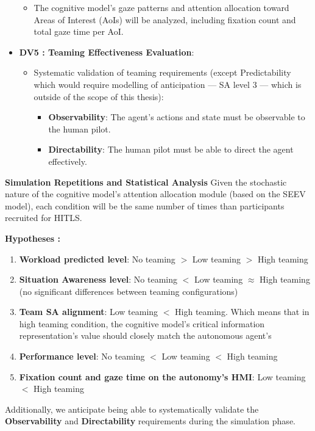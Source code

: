 \documentclass[12pt,a4paper]{article} %
\begin{document}
\begin{itemize}
	\begin{itemize}
	\item The cognitive model's gaze patterns and attention allocation toward Areas of Interest (AoIs) will be analyzed, including fixation count and total gaze time per AoI.
	\end{itemize}
	\item \textbf{DV5 : Teaming Effectiveness Evaluation}:
	\begin{itemize}
	\item Systematic validation of teaming requirements (except Predictability which would require modelling of anticipation --- SA level 3 --- which is outside of the scope of this thesis):
	\begin{itemize}
	\item \textbf{Observability}: The agent's actions and state must be observable to the human pilot.
	\item \textbf{Directability}: The human pilot must be able to direct the agent effectively.
	\end{itemize}
	\end{itemize}
	\end{itemize}
	
	\textbf{Simulation Repetitions and Statistical Analysis}
	Given the stochastic nature of the cognitive model's attention allocation module (based on the SEEV model), each condition will be the same number of times than participants recruited for HITLS.

	\textbf{Hypotheses :}
	\begin{enumerate}[label=\textbf{H\arabic* :}]
	\label{hypotheses}
	\item \textbf{Workload predicted level}: No teaming $>$ Low teaming $>$ High teaming
	\item \textbf{Situation Awareness level}: No teaming $<$ Low teaming $\approx$ High teaming (no significant differences between teaming configurations)
	\item \textbf{Team SA alignment}: Low teaming $<$ High teaming. Which means that in high teaming condition, the cognitive model's critical information representation's value should closely match the autonomous agent's
	\item \textbf{Performance level}: No teaming $<$ Low teaming $<$ High teaming
	\item \textbf{Fixation count and gaze time on the autonomy's HMI}: Low teaming $<$ High teaming
	\end{enumerate}
	Additionally, we anticipate being able to systematically validate the \textbf{Observability} and \textbf{Directability} requirements during the simulation phase.
	
\end{document}
